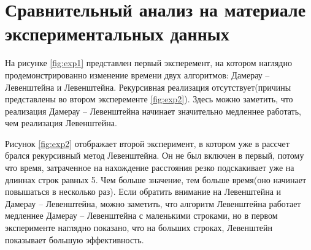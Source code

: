 \section{ Сравнительный анализ на материале экспериментальных данных}

На рисунке \ref{fig:exp1} представлен первый эксперемент, на котором наглядно продемонстрированно изменение времени двух алгоритмов: Дамерау -- Левенштейна и Левенштейна. Рекурсивная реализация отсутствует(причины представлены во втором эксперементе \ref{fig:exp2}). Здесь можно заметить, что реализация Дамерау -- Левенштейна начинает значительно медленнее работать, чем реализация Левенштейна. 

\begin{figure}[ht!]
\end{figure}

Рисунок \ref{fig:exp2} отображает второй эксперимент, в котором уже в рассчет брался рекурсивный метод Левенштейна. Он не был включен в первый, потому что время, затраченное на нахождение расстояния резко подскакивает уже на длиннах строк равных 5. Чем больше значение, тем больше время(оно начинает повышаться в несколько раз). Если обратить внимание на Левенштейна и Дамерау -- Левенштейна, можно заметить, что алгоритм Левенштейна работает медленнее Дамерау -- Левенштейна с маленькими строками, но в первом эксперименте наглядно показано, что на больших строках, Левенштейн показывает большую эффективность.

